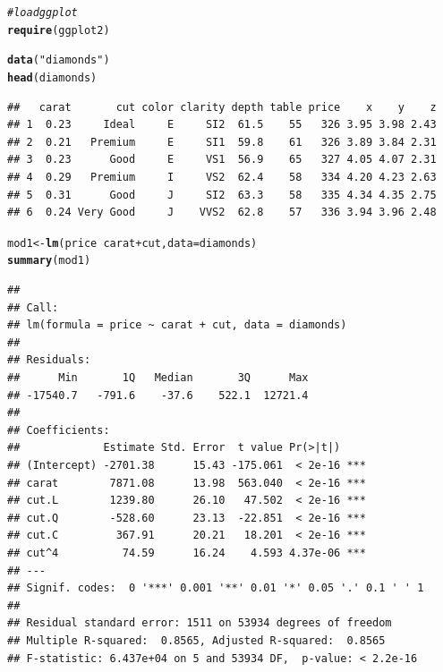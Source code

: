 \documentclass{article}\usepackage[]{graphicx}\usepackage[]{color}
\makeatletter
\newcommand{\hlstr}[1]{\textcolor[rgb]{0.192,0.494,0.8}{#1}}%
\newcommand{\hlcom}[1]{\textcolor[rgb]{0.678,0.584,0.686}{\textit{#1}}}%
\newcommand{\hlopt}[1]{\textcolor[rgb]{0,0,0}{#1}}%
\newcommand{\hlstd}[1]{\textcolor[rgb]{0.345,0.345,0.345}{#1}}%
\newcommand{\hlkwb}[1]{\textcolor[rgb]{0.69,0.353,0.396}{#1}}%
\newcommand{\hlkwc}[1]{\textcolor[rgb]{0.333,0.667,0.333}{#1}}%
\newcommand{\hlkwd}[1]{\textcolor[rgb]{0.737,0.353,0.396}{\textbf{#1}}}%
\newenvironment{kframe}{%
 \def\at@end@of@kframe{}%
 \ifinner\ifhmode%
  \def\at@end@of@kframe{\end{minipage}}%
  \begin{minipage}{\columnwidth}%
 \fi\fi%
 \def\FrameCommand##1{\hskip\@totalleftmargin \hskip-\fboxsep
 \colorbox{shadecolor}{##1}\hskip-\fboxsep
     \hskip-\linewidth \hskip-\@totalleftmargin \hskip\columnwidth}%
 \MakeFramed {\advance\hsize-\width
   \@totalleftmargin\z@ \linewidth\hsize
   \@setminipage}}%
 {\par\unskip\endMakeFramed%
 \at@end@of@kframe}
\newenvironment{knitrout}{}{} %
\makeatother
\begin{document}
\begin{knitrout}
\color{fgcolor}\begin{kframe}
\begin{alltt}
\hlcom{# load ggplot}
\hlkwd{require}\hlstd{(ggplot2)}
\end{alltt}


{\ttfamily\noindent\itshape\color{messagecolor}{\#\# Loading required package: ggplot2}}\begin{alltt}
\hlkwd{data}\hlstd{(}\hlstr{"diamonds"}\hlstd{)}
\hlkwd{head}\hlstd{(diamonds)}
\end{alltt}
\begin{verbatim}
##   carat       cut color clarity depth table price    x    y    z
## 1  0.23     Ideal     E     SI2  61.5    55   326 3.95 3.98 2.43
## 2  0.21   Premium     E     SI1  59.8    61   326 3.89 3.84 2.31
## 3  0.23      Good     E     VS1  56.9    65   327 4.05 4.07 2.31
## 4  0.29   Premium     I     VS2  62.4    58   334 4.20 4.23 2.63
## 5  0.31      Good     J     SI2  63.3    58   335 4.34 4.35 2.75
## 6  0.24 Very Good     J    VVS2  62.8    57   336 3.94 3.96 2.48
\end{verbatim}
\begin{alltt}
\hlstd{mod1} \hlkwb{<-} \hlkwd{lm}\hlstd{(price}\hlopt{~}\hlstd{carat} \hlopt{+} \hlstd{cut,} \hlkwc{data}\hlstd{=diamonds)}
\hlkwd{summary}\hlstd{(mod1)}
\end{alltt}
\begin{verbatim}
## 
## Call:
## lm(formula = price ~ carat + cut, data = diamonds)
## 
## Residuals:
##      Min       1Q   Median       3Q      Max 
## -17540.7   -791.6    -37.6    522.1  12721.4 
## 
## Coefficients:
##             Estimate Std. Error  t value Pr(>|t|)    
## (Intercept) -2701.38      15.43 -175.061  < 2e-16 ***
## carat        7871.08      13.98  563.040  < 2e-16 ***
## cut.L        1239.80      26.10   47.502  < 2e-16 ***
## cut.Q        -528.60      23.13  -22.851  < 2e-16 ***
## cut.C         367.91      20.21   18.201  < 2e-16 ***
## cut^4          74.59      16.24    4.593 4.37e-06 ***
## ---
## Signif. codes:  0 '***' 0.001 '**' 0.01 '*' 0.05 '.' 0.1 ' ' 1
## 
## Residual standard error: 1511 on 53934 degrees of freedom
## Multiple R-squared:  0.8565,	Adjusted R-squared:  0.8565 
## F-statistic: 6.437e+04 on 5 and 53934 DF,  p-value: < 2.2e-16
\end{verbatim}
\end{kframe}
\end{knitrout}
\end{document}
